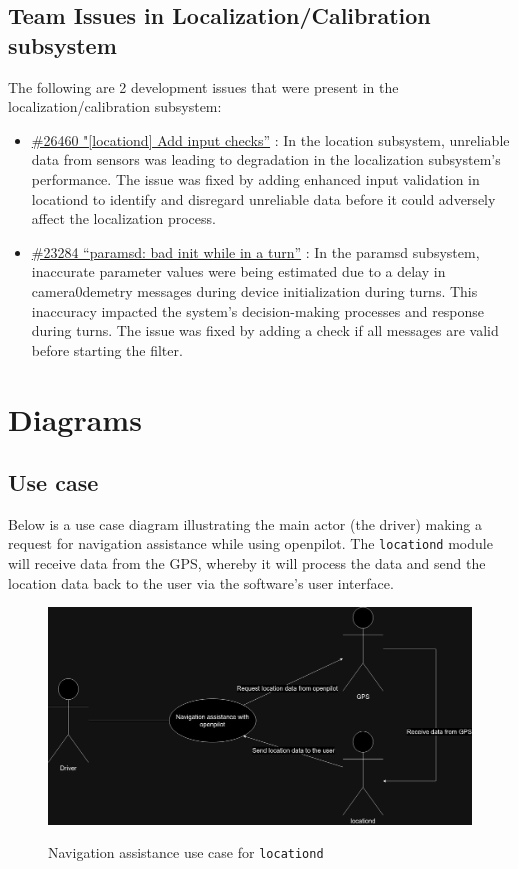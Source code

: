 \documentclass[12pt]{article}
\begin{document}
\subsection{Team Issues in Localization/Calibration subsystem}
The following are 2 development issues that were present in the localization/calibration subsystem:

\begin{itemize}
    \item \href{https://github.com/commaai/openpilot/pull/26460}{\#26460 "[locationd] Add input checks”} : In the location subsystem, unreliable data from sensors was leading to degradation in the localization subsystem’s performance. The issue was fixed by adding enhanced input validation in locationd to identify and disregard unreliable data before it could adversely affect the localization process. 
    \item \href{https://github.com/commaai/openpilot/issues/21303}{\#23284 “paramsd: bad init while in a turn”} : In the paramsd subsystem, inaccurate parameter values were being estimated due to a delay in camera0demetry messages during device initialization during turns. This inaccuracy impacted the system's decision-making processes and response during turns. The issue was fixed by adding a check if all messages are valid before starting the filter.
\end{itemize}

\section{Diagrams}

\subsection{Use case}

Below is a use case diagram illustrating the main actor (the driver) making a request for navigation assistance while using openpilot. The \texttt{locationd} module will receive data from the GPS, whereby it will process the data and send the location data back to the user via the software's user interface.

\begin{figure}[H]
    \centering
    \includegraphics[scale=0.2]{usecase.jpg}\\
    \caption{Navigation assistance use case for \texttt{locationd}}
    \label{fig:enter-label}
\end{figure}
\end{document}
